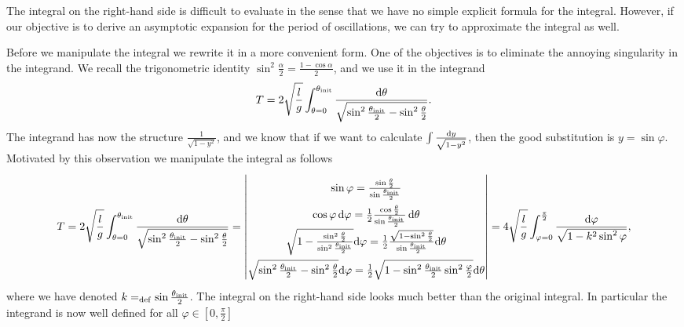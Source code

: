 \documentclass[reqno, a4paper]{amsart}
\begin{document}
The integral on the right-hand side is difficult to evaluate in the sense that we have no simple explicit formula for the integral. However, if our objective is to derive an asymptotic expansion for the period of oscillations, we can try to approximate the integral as well.

Before we manipulate the integral we rewrite it in a more convenient form. One of the objectives is to eliminate the annoying singularity in the integrand. We recall the trigonometric identity $\sin^2 \frac{\alpha}{2} = \frac{1 - \cos \alpha}{2}$, and we use it in the integrand
\begin{equation}
  \label{eq:14}
  T
  =
  2
  \sqrt{
    \frac{l}{g}
  }
  \int_{\theta=0}^{\theta_{\mathrm{init}}}
  \frac{\mathrm{d} \theta}
  {
    \sqrt{\sin^2 \frac{\theta_{\mathrm{init}}}{2} - \sin^2 \frac{\theta}{2}}
  }
  .
\end{equation}
The integrand has now the structure $\frac{1}{\sqrt{1 - y^2}}$, and we know that if we want to calculate $\int \frac{\mathrm{d} y}{\sqrt{1 - y^2}}$, then the good substitution is $y = \sin \varphi$. Motivated by this observation we manipulate the integral as follows
\begin{equation}
  \label{eq:15}
  \renewcommand\arraystretch{2} %
  T
  =
  2
  \sqrt{
    \frac{l}{g}
  }
  \int_{\theta=0}^{\thetainit}
  \frac{\diff \theta}
  {
    \sqrt{\sin^2 \frac{\thetainit}{2} - \sin^2 \frac{\theta}{2}}
  }
  =
  \begin{vmatrix}
    \sin \varphi = \frac{\sin \frac{\theta}{2}}{\sin \frac{\thetainit}{2}} \\
    \cos \varphi  \, \diff \varphi = \frac{1}{2} \frac{\cos \frac{\theta}{2}}{\sin \frac{\thetainit}{2}}  \, \diff \theta \\
    \sqrt{1 - \frac{\sin^2 \frac{\theta}{2}}{\sin^2 \frac{\thetainit}{2}}} \diff \varphi = \frac{1}{2} \frac{\sqrt{1 - \sin^2 \frac{\theta}{2}}}{\sin \frac{\thetainit}{2}}
    \diff \theta \\
    \sqrt{\sin^2 \frac{\thetainit}{2} - \sin^2 \frac{\theta}{2}} \diff \varphi
    =
    \frac{1}{2} \sqrt{1 - \sin^2 \frac{\thetainit}{2} \sin^2 \frac{\varphi}{2}}
    \diff \theta
  \end{vmatrix}
  =
  4
  \sqrt{
    \frac{l}{g}
  }
  \int_{\varphi=0}^{\frac{\pi}{2}}
  \frac{\diff \varphi}
  {
    \sqrt{1 - k^2 \sin^2 \varphi}
  }
  ,
\end{equation}
where we have denoted $k =_{\mathrm{def}} \sin \frac{\theta_{\mathrm{init}}}{2}$. The integral on the right-hand side looks much better than the original integral. In particular the integrand is now well defined for all $\varphi \in \left[0, \frac{\pi}{2} \right]$ 
\end{document}
